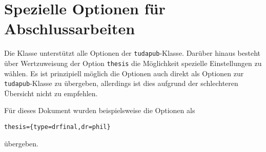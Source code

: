 \documentclass[
	ngerman,
	ruledheaders=chapter,%
	class=book,%
	thesis={
		type=dr,
		dr=rernat
	},
	accentcolor=9c,%
	custommargins=true,%
	marginpar=false,%
	fontsize=11pt,%
]{tudapub}
\let\file\texttt
\let\code\texttt
\begin{document}
\section{Spezielle Optionen für Abschlussarbeiten}
Die Klasse unterstützt alle Optionen der \file{tudapub}-Klasse. Darüber hinaus besteht über Wertzuweisung der Option \code{thesis} die Möglichkeit spezielle Einstellungen zu wählen.
Es ist prinzipiell möglich die Optionen auch direkt als Optionen zur \file{tudapub}-Klasse zu übergeben, allerdings ist dies aufgrund der schlechteren Übersicht nicht zu empfehlen.

Für dieses Dokument wurden beispielsweise die Optionen als
\begin{verbatim}
thesis={type=drfinal,dr=phil}
\end{verbatim}
übergeben.
\end{document}
